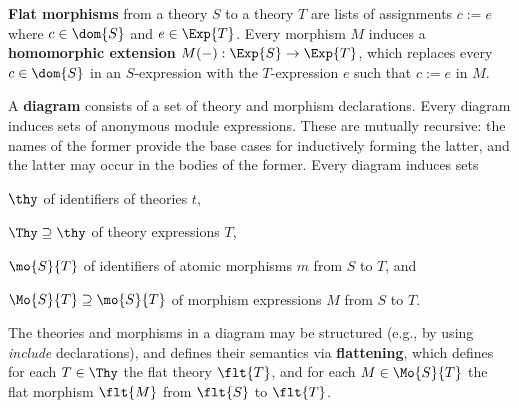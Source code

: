 \textbf{Flat morphisms} from a theory $S$ to a theory $T$ are lists of assignments $c:=e$ where $c\in\dom{S}$ and $e\in\Exp{T}$.
Every morphism $M$ induces a \textbf{homomorphic extension} $M(-):\Exp{S}\to\Exp{T}$, which replaces every $c\in\dom{S}$ in an $S$-expression with the $T$-expression $e$ such that $c:=e$ in $M$.

A \textbf{diagram} consists of a set of theory and morphism declarations.
Every diagram induces sets of anonymous module expressions.
These are mutually recursive: the names of the former provide the base cases for inductively forming the latter, and the latter may occur in the bodies of the former.
Every diagram induces sets
\begin{compactitem}
 \item $\thy$ of identifiers of theories $t$,
 \item $\Thy\supseteq \thy$ of theory expressions $T$,
 \item $\mo{S}{T}$ of identifiers of atomic morphisms $m$ from $S$ to $T$, and
 \item $\Mo{S}{T}\supseteq\mo{S}{T}$ of morphism expressions $M$ from $S$ to $T$.
\end{compactitem}

The theories and morphisms in a diagram may be structured (e.g., by using \emph{include} declarations), and \mmt defines their semantics via \textbf{flattening}, which defines for each $T\in\Thy$ the flat theory $\flt{T}$, and for each $M\in\Mo{S}{T}$ the flat morphism $\flt{M}$ from $\flt{S}$ to $\flt{T}$.

